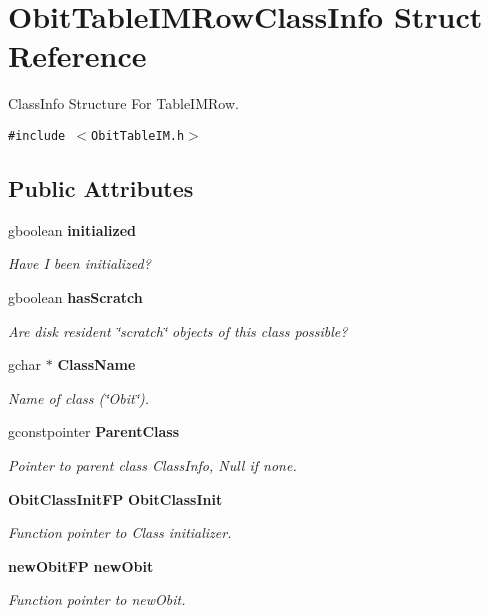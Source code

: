 \section{Obit\-Table\-IMRow\-Class\-Info Struct Reference}
\label{structObitTableIMRowClassInfo}
Class\-Info Structure For Table\-IMRow.  


{\tt \#include $<$Obit\-Table\-IM.h$>$}

\subsection*{Public Attributes}
\begin{CompactItemize}
\item 
gboolean {\bf initialized}
\begin{CompactList}\small\item\em Have I been initialized? \item\end{CompactList}\item 
gboolean {\bf has\-Scratch}
\begin{CompactList}\small\item\em Are disk resident \char`\"{}scratch\char`\"{} objects of this class possible? \item\end{CompactList}\item 
gchar $\ast$ {\bf Class\-Name}
\begin{CompactList}\small\item\em Name of class (\char`\"{}Obit\char`\"{}). \item\end{CompactList}\item 
gconstpointer {\bf Parent\-Class}
\begin{CompactList}\small\item\em Pointer to parent class Class\-Info, Null if none. \item\end{CompactList}\item 
{\bf Obit\-Class\-Init\-FP} {\bf Obit\-Class\-Init}
\begin{CompactList}\small\item\em Function pointer to Class initializer. \item\end{CompactList}\item 
{\bf new\-Obit\-FP} {\bf new\-Obit}
\begin{CompactList}\small\item\em Function pointer to new\-Obit. \item\end{CompactList}\item 

\end{CompactItemize}
